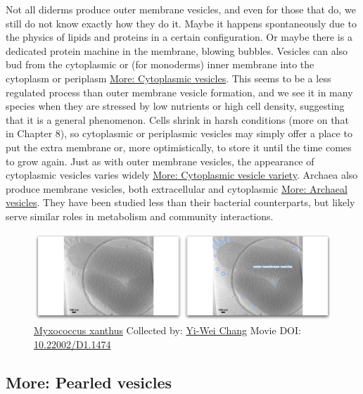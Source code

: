 \documentclass[]{tufte-book}
\begin{document}
Not all diderms produce outer membrane vesicles, and even for those that
do, we still do not know exactly how they do it. Maybe it happens
spontaneously due to the physics of lipids and proteins in a certain
configuration. Or maybe there is a dedicated protein machine in the
membrane, blowing bubbles. Vesicles can also bud from the cytoplasmic or
(for monoderms) inner membrane into the cytoplasm or periplasm
\protect\hyperlink{Cytoplasmic_vesicles}{More: Cytoplasmic vesicles}.
This seems to be a less regulated process than outer membrane vesicle
formation, and we see it in many species when they are stressed by low
nutrients or high cell density, suggesting that it is a general
phenomenon. Cells shrink in harsh conditions (more on that in Chapter
8), so cytoplasmic or periplasmic vesicles may simply offer a place to
put the extra membrane or, more optimistically, to store it until the
time comes to grow again. Just as with outer membrane vesicles, the
appearance of cytoplasmic vesicles varies widely
\protect\hyperlink{Cytoplasmic_vesicle_variety}{More: Cytoplasmic
vesicle variety}. Archaea also produce membrane vesicles, both
extracellular and cytoplasmic
\protect\hyperlink{Archaeal_vesicles}{More: Archaeal vesicles}. They
have been studied less than their bacterial counterparts, but likely
serve similar roles in metabolism and community interactions.





\begin{figure}
\includegraphics{movie_stills/2_4} \caption[\protect\hyperlink{tree}{Myxococcus xanthus} Collected by:
\protect\hyperlink{yi-wei_chang}{Yi-Wei Chang} Movie DOI:
\href{https://doi.org/10.22002/D1.1474}{10.22002/D1.1474}]{\protect\hyperlink{tree}{Myxococcus xanthus} Collected by:
\protect\hyperlink{yi-wei_chang}{Yi-Wei Chang} Movie DOI:
\href{https://doi.org/10.22002/D1.1474}{10.22002/D1.1474}}\label{fig:2-4}
\end{figure}

\hypertarget{Pearled_vesicles}{\subsection*{More: Pearled
vesicles}\label{Pearled_vesicles}}
\end{document}
